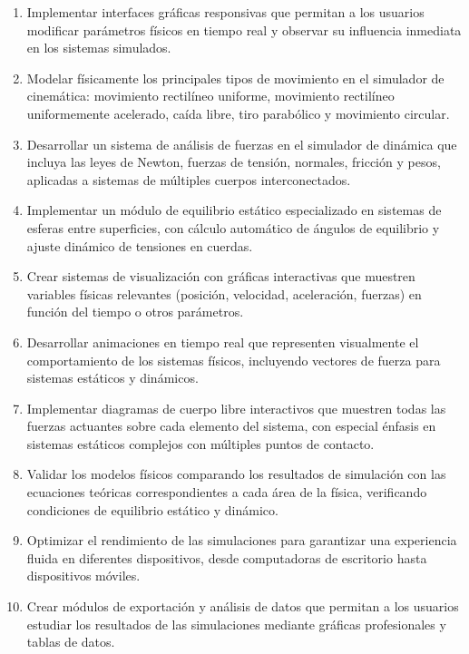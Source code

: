 \begin{enumerate}
    \item Implementar interfaces gráficas responsivas que permitan a los usuarios modificar parámetros físicos en tiempo real y observar su influencia inmediata en los sistemas simulados.
    
    \item Modelar físicamente los principales tipos de movimiento en el simulador de cinemática: movimiento rectilíneo uniforme, movimiento rectilíneo uniformemente acelerado, caída libre, tiro parabólico y movimiento circular.
    
    \item Desarrollar un sistema de análisis de fuerzas en el simulador de dinámica que incluya las leyes de Newton, fuerzas de tensión, normales, fricción y pesos, aplicadas a sistemas de múltiples cuerpos interconectados.
    
    \item Implementar un módulo de equilibrio estático especializado en sistemas de esferas entre superficies, con cálculo automático de ángulos de equilibrio y ajuste dinámico de tensiones en cuerdas.
    
    \item Crear sistemas de visualización con gráficas interactivas que muestren variables físicas relevantes (posición, velocidad, aceleración, fuerzas) en función del tiempo o otros parámetros.
    
    \item Desarrollar animaciones en tiempo real que representen visualmente el comportamiento de los sistemas físicos, incluyendo vectores de fuerza para sistemas estáticos y dinámicos.
    
    \item Implementar diagramas de cuerpo libre interactivos que muestren todas las fuerzas actuantes sobre cada elemento del sistema, con especial énfasis en sistemas estáticos complejos con múltiples puntos de contacto.
    
    \item Validar los modelos físicos comparando los resultados de simulación con las ecuaciones teóricas correspondientes a cada área de la física, verificando condiciones de equilibrio estático y dinámico.
    
    \item Optimizar el rendimiento de las simulaciones para garantizar una experiencia fluida en diferentes dispositivos, desde computadoras de escritorio hasta dispositivos móviles.
    
    \item Crear módulos de exportación y análisis de datos que permitan a los usuarios estudiar los resultados de las simulaciones mediante gráficas profesionales y tablas de datos.
\end{enumerate}
